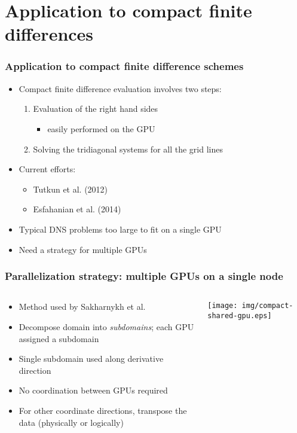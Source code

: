 

\section{Application to compact finite differences}

\begin{frame}
\frametitle{Application to compact finite difference schemes}
\begin{itemize}
\item Compact finite difference evaluation involves two steps:
\begin{enumerate}
\item Evaluation of the right hand sides
\begin{itemize}
    \item easily performed on the GPU
\end{itemize}
\item Solving the tridiagonal systems for all the grid lines
\end{enumerate}
\item Current efforts:
\begin{itemize}
    \item Tutkun et al. (2012)
    \item Esfahanian et al. (2014)
\end{itemize}
\item Typical DNS problems too large to fit on a single GPU
\item Need a strategy for multiple GPUs
\end{itemize}
\end{frame}

\begin{frame}
\frametitle{Parallelization strategy: multiple GPUs on a single node}
\begin{columns}
\begin{column}{0.5\textwidth}
\begin{itemize}
\item Method used by Sakharnykh et al.
\item Decompose domain into \emph{subdomains};
    each GPU assigned a subdomain
\item Single subdomain used along derivative direction
\item No coordination between GPUs required
\item For other coordinate directions,
    transpose the data (physically or logically)
\end{itemize}
\end{column}
\begin{column}{0.5\textwidth}
\texttt{[image: img/compact-shared-gpu.eps]}
\end{column}
\end{columns}
\end{frame}

